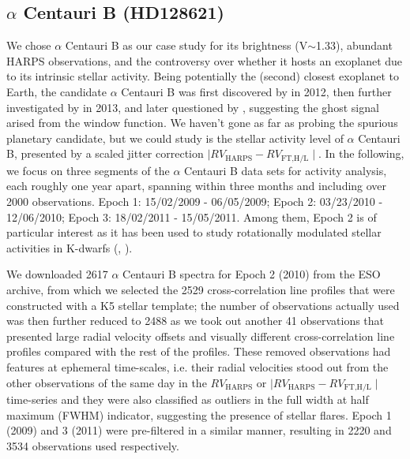 \subsection{$\alpha$ Centauri B (HD128621)}

We chose $\alpha$ Centauri B as our case study for its brightness (V$\sim$1.33), abundant HARPS observations, and the controversy over whether it hosts an exoplanet due to its intrinsic stellar activity. Being potentially the (second) closest exoplanet to Earth, the candidate $\alpha$ Centauri B was first discovered by \cite{Dumusque_Centauri_B} in 2012, then further investigated by \cite{Hatzes2013} in 2013, and later questioned by \cite{Rajpaul_Alpha_Cen_B}, suggesting the ghost signal arised from the window function. We haven't gone as far as probing the spurious planetary candidate, but we could study is the stellar activity level of $\alpha$ Centauri B, presented by a scaled jitter correction $\mid RV_\text{HARPS} - RV_\text{FT,H/L}\mid$. In the following, we focus on three segments of the $\alpha$ Centauri B data sets for activity analysis, each roughly one year apart, spanning within three months and including over 2000 observations. Epoch 1: 15/02/2009 - 06/05/2009; Epoch 2: 03/23/2010 - 12/06/2010; Epoch 3: 18/02/2011 - 15/05/2011. Among them, Epoch 2 is of particular interest as it has been used to study rotationally modulated stellar activities in K-dwarfs (\cite{Thompson2017MNRAS}, \cite{Wise2018}). 

We downloaded 2617 $\alpha$ Centauri B spectra for Epoch 2 (2010) from the ESO archive, from which we selected the 2529 cross-correlation line profiles that were constructed with a K5 stellar template; the number of observations actually used was then further reduced to 2488 as we took out another 41 observations that presented large radial velocity offsets and visually different cross-correlation line profiles compared with the rest of the profiles. These removed observations had features at ephemeral time-scales, i.e. their radial velocities stood out from the other observations of the same day in the $RV_\text{HARPS}$ or $\mid RV_\text{HARPS} - RV_\text{FT,H/L}\mid$ time-series and they were also classified as outliers in the full width at half maximum (FWHM) indicator, suggesting the presence of stellar flares. Epoch 1 (2009) and 3 (2011) were pre-filtered in a similar manner, resulting in 2220 and 3534 observations used respectively.

